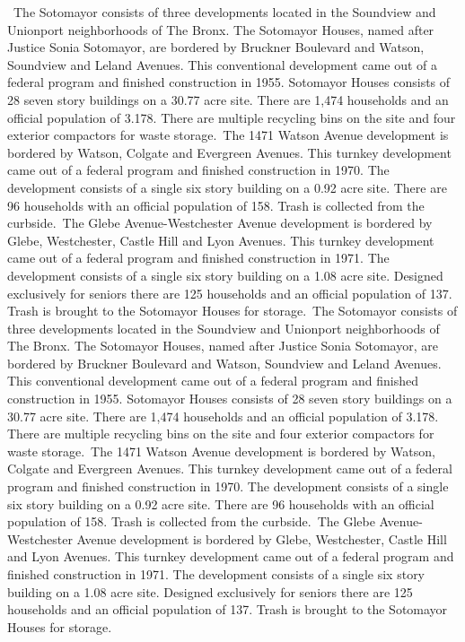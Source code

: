 \
The Sotomayor consists of three developments located in the Soundview and Unionport neighborhoods of The Bronx. The Sotomayor Houses, named after Justice Sonia Sotomayor, are bordered by Bruckner Boulevard and Watson, Soundview and Leland Avenues. This conventional development came out of a federal program and finished construction in 1955. Sotomayor Houses consists of 28 seven story buildings on a 30.77 acre site. There are 1,474 households and an official population of 3.178. There are multiple recycling bins on the site and four exterior compactors for waste storage.\
The 1471 Watson Avenue development is bordered by Watson, Colgate and Evergreen Avenues. This turnkey development came out of a federal program and finished construction in 1970. The development consists of a single six story building on a 0.92 acre site. There are 96 households with an official population of 158. Trash is collected from the curbside.\
The Glebe Avenue-Westchester Avenue development is bordered by Glebe, Westchester, Castle Hill and Lyon Avenues. This turnkey development came out of a federal program and finished construction in 1971. The development consists of a single six story building on a 1.08 acre site. Designed exclusively for seniors there are 125 households and an official population of 137. Trash is brought to the Sotomayor Houses for storage.\
The Sotomayor consists of three developments located in the Soundview and Unionport neighborhoods of The Bronx. The Sotomayor Houses, named after Justice Sonia Sotomayor, are bordered by Bruckner Boulevard and Watson, Soundview and Leland Avenues. This conventional development came out of a federal program and finished construction in 1955. Sotomayor Houses consists of 28 seven story buildings on a 30.77 acre site. There are 1,474 households and an official population of 3.178. There are multiple recycling bins on the site and four exterior compactors for waste storage.\
The 1471 Watson Avenue development is bordered by Watson, Colgate and Evergreen Avenues. This turnkey development came out of a federal program and finished construction in 1970. The development consists of a single six story building on a 0.92 acre site. There are 96 households with an official population of 158. Trash is collected from the curbside.\
The Glebe Avenue-Westchester Avenue development is bordered by Glebe, Westchester, Castle Hill and Lyon Avenues. This turnkey development came out of a federal program and finished construction in 1971. The development consists of a single six story building on a 1.08 acre site. Designed exclusively for seniors there are 125 households and an official population of 137. Trash is brought to the Sotomayor Houses for storage.
